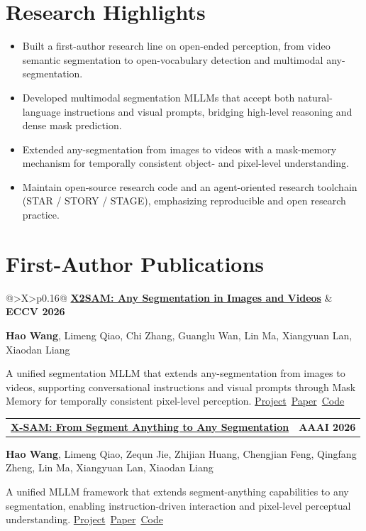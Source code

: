 \documentclass[10pt,letterpaper]{article}
\makeatletter
\newcommand{\venue}[1]{\textcolor{accent}{\footnotesize\bfseries #1}}
\newcommand{\sep}{{\color{rule}\;\textbar\;}}
\newcommand{\publication}[5]{%
  \par\addvspace{2pt}
  \noindent\begin{minipage}{\linewidth}
  \begin{tabularx}{\textwidth}{@{}>{\RaggedRight\arraybackslash}X>{\RaggedLeft\arraybackslash}p{0.16\textwidth}@{}}
    \textbf{\href{#1}{\textcolor{ink}{#2}}} & \venue{#3}
  \end{tabularx}\par
  \vspace{-1pt}
  {\small #4}\par
  \vspace{1pt}
  \textcolor{muted}{\small #5}\par
  \end{minipage}\par
  \vspace{6pt}
}
\makeatother
\begin{document}
\section{Research Highlights}
\begin{itemize}
  \item Built a first-author research line on open-ended perception, from video semantic segmentation to open-vocabulary detection and multimodal any-segmentation.
  \item Developed multimodal segmentation MLLMs that accept both natural-language instructions and visual prompts, bridging high-level reasoning and dense mask prediction.
  \item Extended any-segmentation from images to videos with a mask-memory mechanism for temporally consistent object- and pixel-level understanding.
  \item Maintain open-source research code and an agent-oriented research toolchain (STAR / STORY / STAGE), emphasizing reproducible and open research practice.
\end{itemize}

\section{First-Author Publications}
\publication
  {https://wanghao9610.github.io/X2SAM/}
  {X2SAM: Any Segmentation in Images and Videos}
  {ECCV 2026}
  {\textbf{Hao Wang}, Limeng Qiao, Chi Zhang, Guanglu Wan, Lin Ma, Xiangyuan Lan, Xiaodan Liang}
  {A unified segmentation MLLM that extends any-segmentation from images to videos, supporting conversational instructions and visual prompts through Mask Memory for temporally consistent pixel-level perception. \mbox{\href{https://wanghao9610.github.io/X2SAM/}{Project} \sep \href{https://arxiv.org/abs/2605.00891}{Paper} \sep \href{https://github.com/wanghao9610/X2SAM}{Code}}}

\publication
  {https://wanghao9610.github.io/X-SAM/}
  {X-SAM: From Segment Anything to Any Segmentation}
  {AAAI 2026}
  {\textbf{Hao Wang}, Limeng Qiao, Zequn Jie, Zhijian Huang, Chengjian Feng, Qingfang Zheng, Lin Ma, Xiangyuan Lan, Xiaodan Liang}
  {A unified MLLM framework that extends segment-anything capabilities to any segmentation, enabling instruction-driven interaction and pixel-level perceptual understanding. \mbox{\href{https://wanghao9610.github.io/X-SAM/}{Project} \sep \href{https://arxiv.org/abs/2508.04655}{Paper} \sep \href{https://github.com/wanghao9610/X-SAM}{Code}}}
\end{document}

